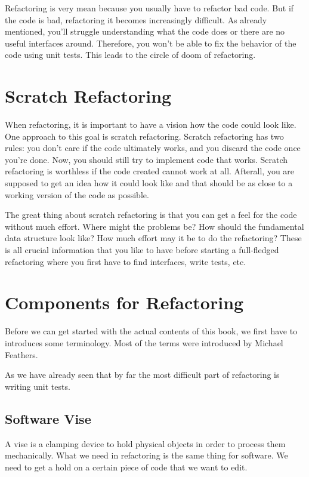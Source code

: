 Refactoring is very mean because you usually have to refactor bad code. But if the code is bad, refactoring it becomes increasingly difficult. As already mentioned, you'll struggle understanding what the code does or there are no useful interfaces around. Therefore, you won't be able to fix the behavior of the code using unit tests. This leads to the circle of doom of refactoring.

\section{Scratch Refactoring}

When refactoring, it is important to have a vision how the code could look like. One approach to this goal is scratch refactoring. Scratch refactoring has two rules: you don't care if the code ultimately works, and you discard the code once you're done. Now, you should still try to implement code that works. Scratch refactoring is worthless if the code created cannot work at all. Afterall, you are supposed to get an idea how it could look like and that should be as close to a working version of the code as possible.

The great thing about scratch refactoring is that you can get a feel for the code without much effort. Where might the problems be? How should the fundamental data structure look like? How much effort may it be to do the refactoring? These is all crucial information that you like to have before starting a full-fledged refactoring where you first have to find interfaces, write tests, etc.

\section{Components for Refactoring}

Before we can get started with the actual contents of this book, we first have to introduces some terminology. Most of the terms were introduced by Michael Feathers.

As we have already seen that by far the most difficult part of refactoring is writing unit tests. 

\subsection{Software Vise}

A vise is a clamping device to hold physical objects in order to process them mechanically. What we need in refactoring is the same thing for software. We need to get a hold on a certain piece of code that we want to edit.

